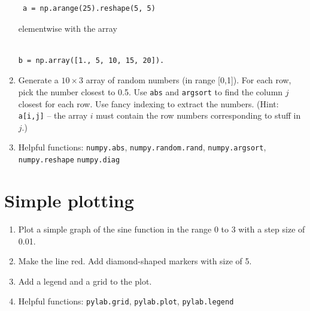 \documentclass[smallheadings,12pt]{scrartcl}
\begin{document}
\begin{enumerate}
    \begin{verbatim}
 a = np.arange(25).reshape(5, 5)    
    \end{verbatim}
 

    elementwise with the array 
    \begin{verbatim}

b = np.array([1., 5, 10, 15, 20]). 
    \end{verbatim}

\item Generate a $10 \times 3$ array of random numbers (in range [0,1]). For each row, pick the number closest to 0.5.
        Use {\tt abs}  and {\tt argsort}  to find the column $j$ closest for each row.
        Use fancy indexing to extract the numbers. (Hint: {\tt a[i,j]}  – the array $i$ must contain the row numbers corresponding to stuff in $j$.)

\item[] Helpful functions: {\tt numpy.abs}, {\tt numpy.random.rand}, {\tt numpy.argsort}, {\tt numpy.reshape}
{\tt numpy.diag}
\end{enumerate}

\section{Simple plotting}
\begin {enumerate}
\item Plot a simple graph of the sine function in the range 0 to 3 with a step size of 0.01.
\item Make the line red. Add diamond-shaped markers with size of 5.
\item Add a legend and a grid to the plot.
\item[] Helpful functions: {\tt pylab.grid}, {\tt pylab.plot}, {\tt pylab.legend}

\end {enumerate}
\end{document}
